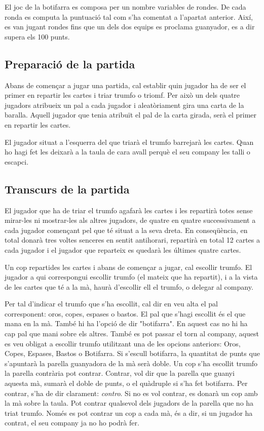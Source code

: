 El joc de la botifarra es composa per un nombre variables de rondes. De cada ronda es computa la puntuació tal com s'ha comentat a l'apartat anterior. Així, es van jugant rondes fins que un dels dos equips es proclama guanyador, es a dir supera els 100 punts.

\subsection{Preparació de la partida}

Abans de començar a jugar una partida, cal establir quin jugador ha de ser el primer en repartir les cartes i triar trumfo o triomf. Per això un dels quatre jugadors atribueix un pal a cada jugador i aleatòriament gira una carta de la baralla. Aquell jugador que tenia atribuït el pal de la carta girada, serà el primer en repartir les cartes.

El jugador situat a l'esquerra del que triarà el trumfo barrejarà les cartes. Quan ho hagi fet les deixarà a la taula de cara avall perquè el seu company les talli o escapci.

\subsection{Transcurs de la partida}

El jugador que ha de triar el trumfo agafarà les cartes i les repartirà totes sense mirar-les ni mostrar-les als altres jugadors, de quatre en quatre successivament a cada jugador començant pel que té situat a la seva dreta. En conseqüència, en total donarà tres voltes senceres en sentit antihorari, repartirà en total 12 cartes a cada jugador i el jugador que reparteix es quedarà les últimes quatre cartes.

Un cop repartides les cartes i abans de començar a jugar, cal escollir trumfo. El jugador a qui correspongui escollir trumfo (el mateix que ha repartit), i a la vista de les cartes que té a la mà, haurà d'escollir ell el trumfo, o delegar al company.

Per tal d'indicar el trumfo que s'ha escollit, cal dir en veu alta el pal corresponent: oros, copes, espases o bastos. El pal que s'hagi escollit és el que mana en la mà. També hi ha l'opció de dir "botifarra". En aquest cas no hi ha cap pal que mani sobre els altres. També es pot passar el torn al company, aquest es veu obligat a escollir trumfo utilitzant una de les opcions anteriors: Oros, Copes, Espases, Bastos o Botifarra. Si s'escull botifarra, la quantitat de punts que s'apuntarà la parella guanyadora de la mà serà doble.
\label{sec:contros}
Un cop s'ha escollit trumfo la parella contrària pot contrar. Contrar, vol dir que la parella que guanyi aquesta mà, sumarà el doble de punts, o el quàdruple si s'ha fet botifarra. Per contrar, s'ha de dir clarament: \emph{contro}. Si no es vol contrar, es donarà un cop amb la mà sobre la taula. Pot contrar qualsevol dels jugadors de la parella que no ha triat trumfo. Només es pot contrar un cop a cada mà, és a dir, si un jugador ha contrat, el seu company ja no ho podrà fer.


